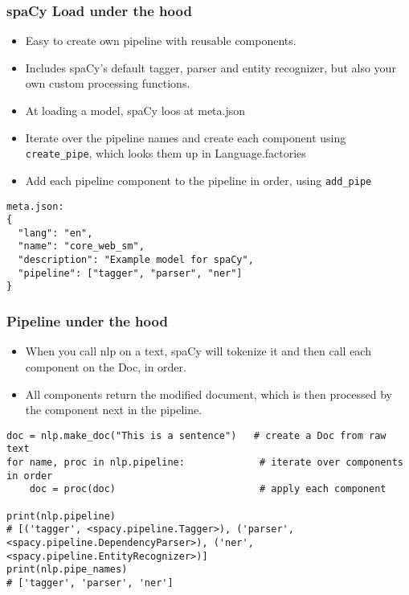 \begin{frame}[fragile]\frametitle{spaCy Load under the hood}
  \begin{itemize}
    \item Easy to create own pipeline with reusable components.
		\item Includes spaCy's default tagger, parser and entity recognizer, but also your own custom processing functions.
		\item At loading a model, spaCy loos at meta.json


\item Iterate over the pipeline names and create each component using \lstinline|create_pipe|, which looks them up in Language.factories
\item Add each pipeline component to the pipeline in order, using \lstinline|add_pipe|

  \end{itemize}
	
\begin{lstlisting}
meta.json:
{
  "lang": "en",
  "name": "core_web_sm",
  "description": "Example model for spaCy",
  "pipeline": ["tagger", "parser", "ner"]
}
\end{lstlisting}	
	
\end{frame}

\begin{frame}[fragile]\frametitle{Pipeline under the hood}
  \begin{itemize}
    \item When you call nlp on a text, spaCy will tokenize it and then call each component on the Doc, in order.


\item All components return the modified document, which is then processed by the component next in the pipeline.

  \end{itemize}
	
	
		\begin{lstlisting}
doc = nlp.make_doc("This is a sentence")   # create a Doc from raw text
for name, proc in nlp.pipeline:             # iterate over components in order
    doc = proc(doc)                         # apply each component

print(nlp.pipeline)
# [('tagger', <spacy.pipeline.Tagger>), ('parser', <spacy.pipeline.DependencyParser>), ('ner', <spacy.pipeline.EntityRecognizer>)]
print(nlp.pipe_names)
# ['tagger', 'parser', 'ner']
\end{lstlisting}	
\end{frame}

